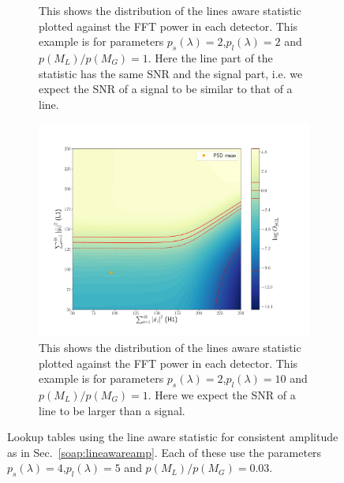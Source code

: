 \begin{figure}
\begin{subfigure}[h]{\linewidth}
\begin{minipage}{0.65\linewidth}
\end{minipage}\hfill
\begin{minipage}{0.35\linewidth}
\caption{This shows the distribution of the lines aware statistic plotted against the \gls{FFT} power in each detector. This example is for parameters $p_s(\lambda) = 2$,$p_l(\lambda) = 2$ and $p(M_L)/p(M_G) = 1$. Here the line part of the statistic has the same \gls{SNR} and the signal part, i.e. we expect the \gls{SNR} of a signal to be similar to that of a line.}
\label{soap:lineawareamp:plot:linesmall}
\end{minipage}
\end{subfigure}

\begin{subfigure}[h]{\linewidth}
\begin{minipage}{0.65\linewidth}
\includegraphics[width=0.9\columnwidth]{C3_soap/lookup_3d_0.pdf}
\end{minipage}\hfill
\begin{minipage}{0.35\linewidth}
\caption{This shows the distribution of the lines aware statistic plotted against the \gls{FFT} power in each detector. This example is for parameters $p_s(\lambda) = 2$,$p_l(\lambda) = 10$ and $p(M_L)/p(M_G) = 1$. Here we expect the \gls{SNR} of a line to be larger than a signal.}
\label{soap:lineawareamp:plot:linebig}
\end{minipage}
\end{subfigure}
\caption[Lookup tables for line aware statistic with consistent amplitude.]{Lookup tables using the line aware statistic for consistent amplitude as in Sec.~\ref{soap:lineawareamp}. Each of these use the parameters $p_s(\lambda) = 4$,$p_l(\lambda) = 5$ and $p(M_L)/p(M_G) = 0.03$. }
\label{soap:lineawareamp:example}
\end{figure}

